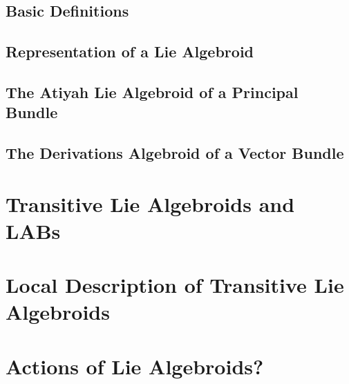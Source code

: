 \subsection{Basic Definitions}



\subsection{Representation of a Lie Algebroid}

\subsection{The Atiyah Lie Algebroid of a Principal Bundle}

\subsection{The Derivations Algebroid of a Vector Bundle}

\section{Transitive Lie Algebroids and LABs}

\section{Local Description of Transitive Lie Algebroids}

\section{Actions of Lie Algebroids?}